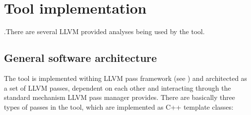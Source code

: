 \section{Tool implementation} \label{ppar-tool-implementation}
\qquad .There are several LLVM provided analyses being used by the tool.

\subsection{General software architecture} \label{ppar-tool-general-software-architecture}
\qquad The tool is implemented withing LLVM pass framework (see \cite{llvm-online-docs-pass-framework}) and architected as a set of LLVM passes, dependent on each other and interacting through the standard mechanism LLVM pass manager provides. There are basically three types of passes in the tool, which are implemented as C++ template classes:
